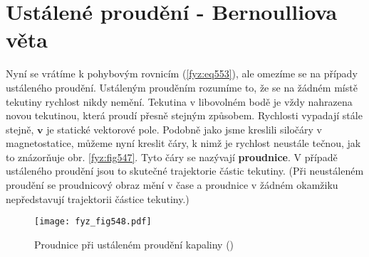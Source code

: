   \section{Ustálené proudění - Bernoulliova věta}\label{fyz:IIchapXLsecIII}
    Nyní se vrátíme k pohybovým rovnicím (\ref{fyz:eq553}), ale omezíme se na případy ustáleného 
    proudění. Ustáleným prouděním rozumíme to, že se na žádném místě tekutiny rychlost nikdy 
    nemění. Tekutina v libovolném bodě je vždy nahrazena novou tekutinou, která proudí přesně 
    stejným způsobem. Rychlosti vypadají stále stejně, \(\bm{v}\) je statické vektorové pole. 
    Podobně jako jsme kreslili siločáry v magnetostatice, můžeme nyní kreslit čáry, k nimž je 
    rychlost neustále tečnou, jak to znázorňuje obr. \ref{fyz:fig547}. Tyto čáry se nazývají 
    \textbf{proudnice}. V případě ustáleného proudění jsou to skutečné trajektorie částic tekutiny. 
    (Při neustáleném proudění se proudnicový obraz mění v čase a proudnice v žádném okamžiku 
    nepředstavují trajektorii částice tekutiny.)
    
    \begin{figure}[ht!] %
      \centering
      \texttt{[image: fyz\_fig548.pdf]}
      \caption{Proudnice při ustáleném proudění kapaliny
               (\cite[s.~747]{Feynman02})}
      \label{fyz:fig548}
    \end{figure}
    
